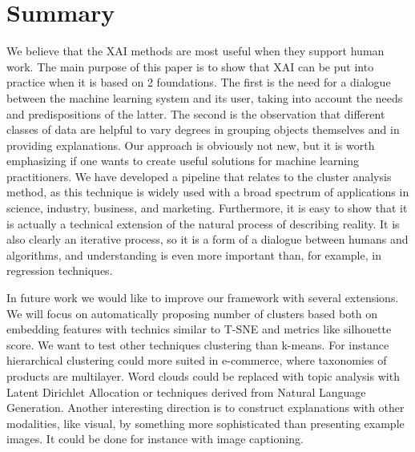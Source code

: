 \documentclass[
 twocolumn,
]{ceurart}
\begin{document}
%


\section{Summary}
We believe that the XAI methods are most useful when they support human work.
The main purpose of this paper is to show that XAI can be put into practice when it is based on 2 foundations.
The first is the need for a dialogue between the machine learning system and its user, taking into account the needs and predispositions of the latter.
The second is the observation that different classes of data are helpful to vary degrees in grouping objects themselves and in providing explanations.
Our approach is obviously not new, but it is worth emphasizing if one wants to create useful solutions for machine learning practitioners.
We have developed a pipeline that relates to the cluster analysis method, as this technique is widely used with a broad spectrum of applications in science, industry, business, and marketing.
Furthermore, it is easy to show that it is actually a technical extension of the natural process of describing reality.
It is also clearly an iterative process, so it is a form of a dialogue between humans and algorithms, and understanding is even more important than, for example, in regression techniques.

In future work we would like to improve our framework with several extensions.
We will focus on automatically proposing number of clusters based both on embedding features with technics similar to T-SNE and metrics like silhouette score.
We want to test other techniques clustering than k-means.
For instance hierarchical clustering could more suited in e-commerce, where taxonomies of products are multilayer.
Word clouds could be replaced with topic analysis with Latent Dirichlet Allocation or techniques derived from Natural Language Generation.
Another interesting direction is to construct explanations with other modalities, like visual, by something more sophisticated than presenting example images.
It could be done for instance with image captioning.
\end{document}
